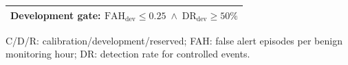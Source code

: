 \begin{table}[!t]
{\begin{tabular*}{\columnwidth}{
    @{\extracolsep{\fill}}
    lcc
    @{}
}
\midrule
\multicolumn{3}{c}{
    \textbf{Development gate:}\quad
    $\mathrm{FAH}_{\mathrm{dev}}\leq0.25
    \;\land\;
    \mathrm{DR}_{\mathrm{dev}}\geq50\%$
} \\
\bottomrule
\end{tabular*}
}

\vspace{2pt}
{\scriptsize\raggedright
C/D/R: calibration/development/reserved;
FAH: false alert episodes per benign monitoring hour;
DR: detection rate for controlled events.
\par}
\end{table}
